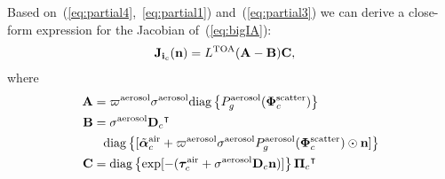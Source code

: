 \documentclass[a4paper]{article}
\newcommand{\OpDiag}[1]{\mathrm{diag}\left\{#1\right\}}
\newcommand{\vect}[1]{\bm{#1}}
\newcommand{\transpose}[1]{{#1}^\intercal}
\begin{document}
Based on~(\ref{eq:partial4},~\ref{eq:partial1})
and~(\ref{eq:partial3}) we can derive a close-form expression for the
Jacobian of~(\ref{eq:bigIA}):
\begin{align}
  {\bf J}_{{\bf i}_c}({\bf n}) &= L^{\rm TOA}({\bf A}-{\bf B}){\bf C}
  ,
  \label{eq:gradient2}
\end{align}
where
\begin{align}
  \label{eq:gradient3}
  {\bf A} &= \varpi^{\rm aerosol}\sigma^{\rm aerosol}
  \OpDiag{ P_g^{\rm aerosol}(\vect{\Phi}^{\rm scatter}_c)} \nonumber\\
  {\bf B} &= {\sigma}^{\rm aerosol}\transpose{{\bf D}_c} \nonumber\\
  & \;\;\; \OpDiag{[\tilde{\vect{\alpha}}^{\rm air}_c + \varpi^{\rm
      aerosol}\sigma^{\rm aerosol} P^{\rm aerosol}_g(\vect{\Phi}^{\rm
      scatter}_c) \odot{\bf n}
    ]} \nonumber \\
  {\bf C} &= \OpDiag{\exp[-(\vect{\tau}_c^{\rm air} + {\sigma}^{\rm
      aerosol} {\bf D}_c {\bf n})]} \transpose{{\vect{\Pi}}_c}
\end{align}
\end{document}
